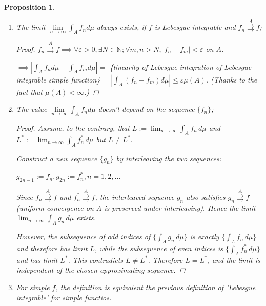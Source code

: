 \documentclass[12pt]{article}
\theoremstyle{blueplain}
\newtheorem{proposition}[theorem]{Proposition}
\theoremstyle{bluedef}
\theoremstyle{blueremark}
\newcommand{\N}{\mathbb{N}}
\newcommand{\eps}{\varepsilon}
\numberwithin{equation}{section}
\begin{document}
\begin{proposition}
  \begin{enumerate}
    \item The limit $\lim\limits_{n \rightarrow \infty} \int_A f_n d \mu$ always exists, if $f$ is Lebesgue integrable and $f_n \overset{A}{\rightrightarrows} f$;
          \begin{proof}
            $f_n \overset{A}{\rightrightarrows} f \implies \forall \eps > 0, \exists N \in \N; \forall m, n > N, |f_n - f_m| < \eps$ on $A$.

            $\implies |\int_A f_n d\mu - \int_A f_m d\mu| =$ \{linearity of Lebesgue integration of Lebesgue integrable simple function\} = $|\int_A (f_n - f_m) d\mu| \leq \eps \mu(A)$. (Thanks to the fact that $\mu(A) < \infty$.)
          \end{proof}
    \item The value $\lim\limits_{n \rightarrow \infty} \int_A f_n d \mu$ doesn't depend on the sequence $\{f_n\}$;
          \begin{proof}
            Assume, to the contrary, that
            $L:=\lim_{n\to\infty}\int_A f_n\,d\mu$ and $L^*:=\lim_{n\to\infty}\int_A f_n^*\,d\mu$ but $L\neq L^*$.

            Construct a new sequence $\{g_n\}$ by \underline{interleaving the two sequences}:

            \(
            g_{2n-1}:=f_n, g_{2n}:=f_n^*, n=1,2,\ldots
            \)

            Since $f_n \overset{A}{\rightrightarrows} f$ and $f_n^* \overset{A}{\rightrightarrows} f$, the interleaved sequence $g_n$ also satisfies $g_n \overset{A}{\rightrightarrows} f$ (uniform convergence on $A$ is preserved under interleaving). Hence the limit
            \(
            \lim_{n\to\infty}\int_A g_n\,d\mu
            \)
            exists.

            However, the subsequence of odd indices of $\{\int_A g_n\,d\mu\}$ is exactly $\{\int_A f_n\,d\mu\}$ and therefore has limit $L$, while the subsequence of even indices is $\{\int_A f_n^*\,d\mu\}$ and has limit $L^*$. This contradicts $L\neq L^*$. Therefore $L=L^*$, and the limit is independent of the chosen approximating sequence.
          \end{proof}
    \item For simple $f$, the definition is equivalent the previous definition of 'Lebesgue integrable' for simple functios.
  \end{enumerate}
\end{proposition}
\end{document}
